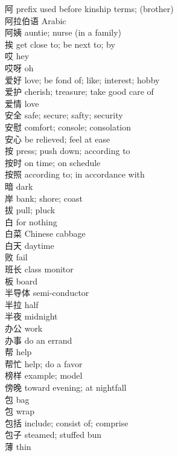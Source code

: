 阿 \quad prefix used before kinship terms; (brother)\\
阿拉伯语 \quad Arabic\\
阿姨 \quad auntie; nurse (in a family)\\
挨 \quad get close to; be next to; by\\
哎 \quad hey\\
哎呀 \quad oh\\
爱好 \quad love; be fond of; like; interest; hobby\\
爱护 \quad cherish; treasure; take good care of\\
爱情 \quad love\\
安全 \quad safe; secure; safty; security\\
安慰 \quad comfort; console; consolation\\
安心 \quad be relieved; feel at ease\\
按 \quad press; push down; according to\\
按时 \quad on time; on schedule\\
按照 \quad according to; in accordance with\\
暗 \quad dark\\
岸 \quad bank; shore; coast\\
拔 \quad pull; pluck\\
白 \quad for nothing\\
白菜 \quad Chinese cabbage\\
白天 \quad daytime\\
败 \quad fail\\
班长 \quad class monitor\\
板 \quad board\\
半导体 \quad semi-conductor\\
半拉 \quad half\\
半夜 \quad midnight\\
办公 \quad work\\
办事 \quad do an errand\\
帮 \quad help\\
帮忙 \quad help; do a favor\\
榜样 \quad example; model\\
傍晚 \quad toward evening; at nightfall\\
包 \quad bag\\
包 \quad wrap\\
包括 \quad include; consist of; comprise\\
包子 \quad steamed; stuffed bun\\
薄 \quad thin\\
